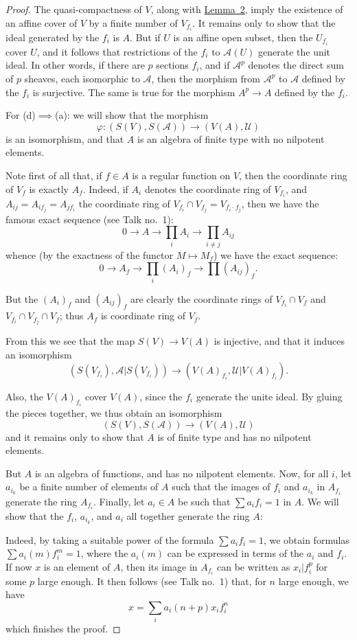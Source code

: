 \documentclass{article}
\theoremstyle{plain}
\newcommand{\scr}[1]{{\mathscr{#1}}}
\newcommand{\oldpage}[1]{\marginpar{\footnotesize$\Big\vert$ \textit{p.~#1}}}
\begin{document}
\begin{proof}
  The quasi-compactness of $V$, along with \hyperref[lemma2]{Lemma~2}, imply the existence of an affine cover of $V$ by a finite number of $V_{f_i}$.
  It remains only to show that the ideal generated by the $f_i$ is $A$.
  But if $U$ is an affine open subset, then the $U_{f_i}$ cover $U$, and it follows that restrictions of the $f_i$ to $\scr{A}(U)$ generate the unit ideal.
  In other words, if there are $p$ sections $f_i$, and if $\scr{A}^p$ denotes the direct sum of $p$ sheaves, each isomorphic to $\scr{A}$, then the morphism from $\scr{A}^p$ to $\scr{A}$ defined by the $f_i$ is surjective.
  The same is true for the morphism $A^p\to A$ defined by the $f_i$.

  \bigskip

  For (d)$\implies$(a):
  we will show that the morphism
  \[
    \varphi\colon (S(V),S(\scr{A})) \to (V(A),\scr{U})
  \]
  is an isomorphism, and that $A$ is an algebra of finite type with no nilpotent elements.

  Note first of all that, if $f\in A$ is a regular function on $V$, then the coordinate ring of $V_f$ is exactly $A_f$.
  Indeed, if $A_i$ denotes the coordinate ring of $V_{f_i}$, and $A_{ij}=A_{if_j}=A_{jf_i}$ the coordinate ring of $V_{f_i}\cap V_{f_j}=V_{f_i\cdot f_j}$, then we have the famous exact sequence (see Talk no.~1):
  \[
    0 \to A \to \prod_i A_i \to \prod_{i\neq j}A_{ij}
  \]
  whence (by the exactness of the functor $M\mapsto M_f$) we have the exact sequence:
  \[
    0 \to A_f \to \prod_i(A_i)_f \to \prod(A_{ij})_f.
  \]

  But the $(A_i)_f$ and $(A_{ij})_f$ are clearly the coordinate rings of
\oldpage{2-07}
  $V_{f_i}\cap V_f$ and $V_{f_i}\cap V_{f_j}\cap V_f$;
  thus $A_f$ is coordinate ring of $V_f$.

  From this we see that the map $S(V)\to V(A)$ is injective, and that it induces an isomorphism
  \[
    (S(V_{f_i}), \scr{A}|S(V_{f_i})) \to (V(A)_{f_i}, \scr{U}|V(A)_{f_i}).
  \]

  Also, the $V(A)_{f_i}$ cover $V(A)$, since the $f_i$ generate the unite ideal.
  By gluing the pieces together, we thus obtain an isomorphism
  \[
    (S(V),S(\scr{A})) \to (V(A),\scr{U})
  \]
  and it remains only to show that $A$ is of finite type and has no nilpotent elements.

  But $A$ is an algebra of functions, and has no nilpotent elements.
  Now, for all $i$, let $a_{i_k}$ be a finite number of elements of $A$ such that the images of $f_i$ and $a_{i_k}$ in $A_{f_i}$ generate the ring $A_{f_i}$.
  Finally, let $a_i\in A$ be such that $\sum a_i f_i=1$ in $A$.
  We will show that the $f_i$, $a_{i_k}$, and $a_i$ all together generate the ring $A$:

  Indeed, by taking a suitable power of the formula $\sum a_i f_i=1$, we obtain formulas $\sum a_i(m)f_i^m=1$, where the $a_i(m)$ can be expressed in terms of the $a_i$ and $f_i$.
  If now $x$ is an element of $A$, then its image in $A_{f_i}$ can be written as $x_i|f_i^p$ for some $p$ large enough.
  It then follows (see Talk no.~1) that, for $n$ large enough, we have
  \[
    x = \sum_i a_i(n+p) x_i f_i^n
  \]
  which finishes the proof.
\end{proof}
\end{document}
